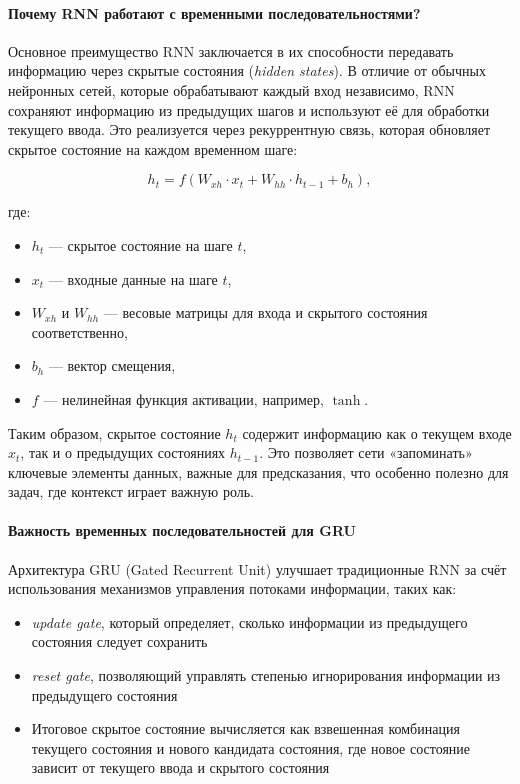 \paragraph{Почему RNN работают с временными последовательностями?}
Основное преимущество RNN заключается в их способности передавать информацию через скрытые состояния (\textit{hidden states}). В отличие от обычных нейронных сетей, которые обрабатывают каждый вход независимо, RNN сохраняют информацию из предыдущих шагов и используют её для обработки текущего ввода. Это реализуется через рекуррентную связь, которая обновляет скрытое состояние на каждом временном шаге:

\[
h_t = f(W_{xh} \cdot x_t + W_{hh} \cdot h_{t-1} + b_h),
\]

где:
\begin{itemize}
    \item $h_t$ --- скрытое состояние на шаге $t$,
    \item $x_t$ --- входные данные на шаге $t$,
    \item $W_{xh}$ и $W_{hh}$ --- весовые матрицы для входа и скрытого состояния соответственно,
    \item $b_h$ --- вектор смещения,
    \item $f$ --- нелинейная функция активации, например, $\tanh$.
\end{itemize}

Таким образом, скрытое состояние $h_t$ содержит информацию как о текущем входе $x_t$, так и о предыдущих состояниях $h_{t-1}$. Это позволяет сети «запоминать» ключевые элементы данных, важные для предсказания, что особенно полезно для задач, где контекст играет важную роль.

\paragraph{Важность временных последовательностей для GRU}
Архитектура GRU (Gated Recurrent Unit) улучшает традиционные RNN за счёт использования механизмов управления потоками информации, таких как:
\begin{itemize}
    \item \textit{update gate}, который определяет, сколько информации из предыдущего состояния следует сохранить
    \item \textit{reset gate}, позволяющий управлять степенью игнорирования информации из предыдущего состояния
    \item Итоговое скрытое состояние вычисляется как взвешенная комбинация текущего состояния и нового кандидата состояния, где новое состояние зависит от текущего ввода и скрытого состояния
\end{itemize}

